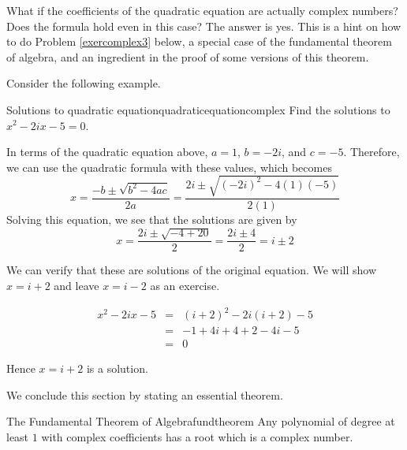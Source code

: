 What if the coefficients of the quadratic equation are actually complex
numbers? Does the formula hold even in this case? The answer is yes. This is
a hint on how to do Problem \ref{exercomplex3} below, a special case of the
fundamental theorem of algebra, and an ingredient in the proof of some
versions of this theorem. 

Consider the following example. 

\begin{example}{Solutions to quadratic equation}{quadraticequationcomplex}
Find the solutions to $x^{2}-2ix-5=0$.
\end{example}

\begin{solution}
In terms of the quadratic equation above, $a=1$, $b=-2i$, and $c=-5$.
Therefore, we can use the quadratic formula with these values, which becomes
\begin{equation*}
x=
\frac{-b\pm \sqrt{b^{2}-4ac}}{2a}
= 
\frac{2i \pm \sqrt{\left(-2i\right)^{2} - 4 (1)(-5)}}{2(1)}
\end{equation*}
Solving this equation, we see that the solutions are given by
\begin{equation*}
x=\frac{2i\pm \sqrt{-4+20}}{2}=\frac{2i\pm 4}{2}=i\pm 2
\end{equation*}

We can verify that these are solutions of the original equation. 
We will show $x = i + 2$ and leave $x = i-2$ as an exercise.

\begin{eqnarray*}
x^{2}-2ix-5
&=& (i+2)^2 - 2i (i+2) - 5 \\
&=& -1 + 4i + 4 + 2 - 4i - 5 \\
&=& 0
\end{eqnarray*}

Hence $x = i+2$ is a solution. 
\end{solution}

We conclude this section by stating an essential theorem.

\begin{theorem}{The Fundamental Theorem of Algebra}{fundtheorem}
Any polynomial of degree at least $1$ with complex coefficients has a root which is a complex number.
\end{theorem}